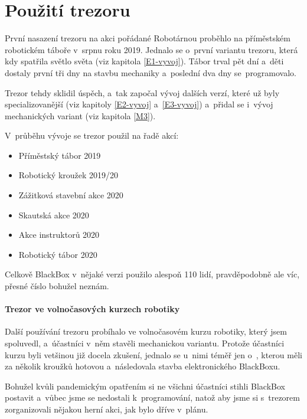 \section{Použití trezoru}
První nasazení trezoru na akci pořádané Robotárnou \parencite{robotarna} proběhlo na pří\-měst\-ském robotickém táboře v~srpnu roku 2019.
Jednalo se o~první variantu trezoru, která kdy spatřila světlo světa (viz kapitola \ref{E1-vyvoj}). 
Tábor trval pět dní a~děti dostaly první tři dny na stavbu mechaniky a~poslední dva dny 
se~programovalo. 

Trezor tehdy sklidil úspěch, a~tak započal vývoj dalších verzí, které už byly specializovanější 
(viz kapitoly \ref{E2-vyvoj} a~\ref{E3-vyvoj}) a~přidal se i~vývoj mechanických
variant (viz kapitola \ref{M3}).

V~průběhu vývoje se trezor použil na řadě akcí:

\begin{itemize}
    \item Příměstský tábor 2019 
    \item Robotický kroužek 2019/20
    \item Zážitková stavební akce 2020  %
    \item Skautská akce 2020
    \item Akce instruktorů 2020
    \item Robotický tábor 2020
\end{itemize}
Celkově BlackBox v~nějaké verzi použilo alespoň 110 lidí, pravděpodobně ale víc, přesné číslo bohužel neznám.

\paragraph{Trezor ve volnočasových kurzech robotiky}
Další používání trezoru pro\-bí\-ha\-lo ve volnočasovém kurzu robotiky, který jsem spoluvedl, a~účastníci v~něm stavěli mechanickou 
variantu.
Protože účastníci kurzu byli vetšinou již docela zkušení, jednalo se u~nimi téměř jen o~, 
kterou měli za několik kroužků hotovou a~následovala stavba elektronického BlackBoxu. 

Bohužel kvůli pandemickým opatřením si ne všichni účastníci stihli BlackBox postavit a~vůbec jsme se nedostali k~programování, 
natož aby jsme si s~trezorem zorganizovali nějakou herní akci, jak bylo dříve v~plánu.

